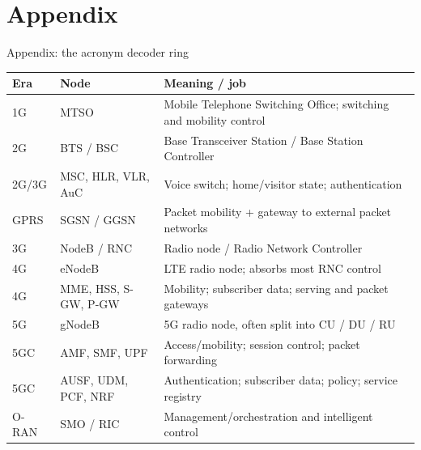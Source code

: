 
\section{Appendix}


\begin{frame}{Appendix: the acronym decoder ring}
  \scriptsize
  \renewcommand{\arraystretch}{1.12}
  \begin{tabularx}{\textwidth}{l l X}
    \toprule
    \textbf{Era} & \textbf{Node} & \textbf{Meaning / job} \\
    \midrule
    1G & MTSO & Mobile Telephone Switching Office; switching and mobility control \\
    2G & BTS / BSC & Base Transceiver Station / Base Station Controller \\
    2G/3G & MSC, HLR, VLR, AuC & Voice switch; home/visitor state; authentication \\
    GPRS & SGSN / GGSN & Packet mobility + gateway to external packet networks \\
    3G & NodeB / RNC & Radio node / Radio Network Controller \\
    4G & eNodeB & LTE radio node; absorbs most RNC control \\
    4G & MME, HSS, S-GW, P-GW & Mobility; subscriber data; serving and packet gateways \\
    5G & gNodeB & 5G radio node, often split into CU / DU / RU \\
    5GC & AMF, SMF, UPF & Access/mobility; session control; packet forwarding \\
    5GC & AUSF, UDM, PCF, NRF & Authentication; subscriber data; policy; service registry \\
    O-RAN & SMO / RIC & Management/orchestration and intelligent control \\
    \bottomrule
  \end{tabularx}

\end{frame}

